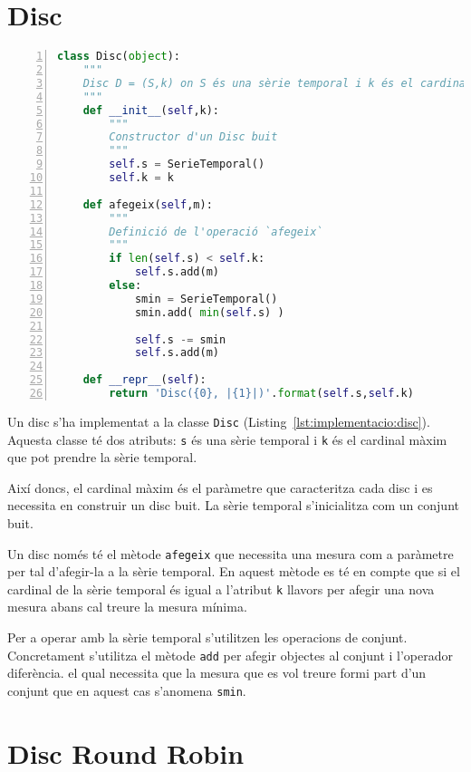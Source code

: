 \section{Disc}

\begin{lstlisting}[float,language=Python,caption=Implementació de la classe Disc,label=lst:implementacio:disc,numbers=left]
class Disc(object):
    """
    Disc D = (S,k) on S és una sèrie temporal i k és el cardinal màxim de S
    """
    def __init__(self,k):
        """
        Constructor d'un Disc buit
        """
        self.s = SerieTemporal()
        self.k = k

    def afegeix(self,m):
        """
        Definició de l'operació `afegeix`
        """
        if len(self.s) < self.k:
            self.s.add(m)
        else:
            smin = SerieTemporal()
            smin.add( min(self.s) )
            
            self.s -= smin
            self.s.add(m)

    def __repr__(self):
        return 'Disc({0}, |{1}|)'.format(self.s,self.k)
\end{lstlisting}

Un disc s'ha implementat a la classe \verb+Disc+ (Listing~\ref{lst:implementacio:disc}). Aquesta classe té dos atributs: \verb+s+ és una sèrie temporal i \verb+k+ és el cardinal màxim que pot prendre la sèrie temporal.

Així doncs, el cardinal màxim és el paràmetre que caracteritza cada disc i es necessita en construir un disc buit. La sèrie temporal s'inicialitza com un conjunt buit.

Un disc només té el mètode \verb+afegeix+ que necessita una mesura com a paràmetre per tal d'afegir-la a la sèrie temporal. En aquest mètode es té en compte que si el cardinal de la sèrie temporal és igual a l'atribut \verb+k+ llavors per afegir una nova mesura abans cal treure la mesura mínima. 

Per a operar amb la sèrie temporal s'utilitzen les operacions de conjunt. Concretament s'utilitza el mètode \verb+add+ per afegir objectes al conjunt i l'operador diferència. el qual necessita que la mesura que es vol treure formi part d'un conjunt que en aquest cas s'anomena \verb+smin+. 


\section{Disc Round Robin}

